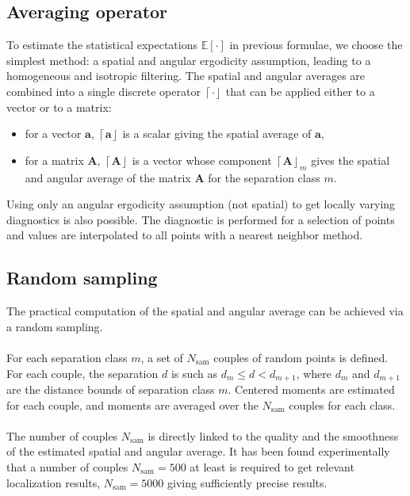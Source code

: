 \documentclass[12pt]{scrartcl}
\begin{document}
\subsection{Averaging operator}
To estimate the statistical expectations $\mathbb{E} [\cdot]$ in previous formulae, we choose the simplest method: a spatial and angular ergodicity assumption, leading to a homogeneous and isotropic filtering. The spatial and angular averages are combined into a single discrete operator $\left\lceil \cdot\right\rfloor$ that can be applied either to a vector or to a matrix:
\begin{itemize}
\item for a vector $\mathbf{a}$,  $\left\lceil \mathbf{a} \right\rfloor$ is a scalar giving the spatial average of $\mathbf{a}$,
\item for a matrix $\mathbf{A}$, $\left\lceil \mathbf{A} \right\rfloor$ is a vector whose component $\left\lceil \mathbf{A} \right\rfloor_m$ gives the spatial and angular average of the matrix $\mathbf{A}$ for the separation class $m$.
\end{itemize}
Using only an angular ergodicity assumption (not spatial) to get locally varying diagnostics is also possible. The diagnostic is performed for a selection of points and values are interpolated to all points with a nearest neighbor method.

\subsection{Random sampling}
The practical computation of the spatial and angular average can be achieved via a random sampling.\\
$  $\\
For each separation class $m$, a set of $N_\mathrm{sam}$ couples of random points is defined. For each couple, the separation $d$ is such as $d_m \le d < d_{m+1}$, where $d_m$ and $d_{m+1}$ are the distance bounds of separation class $m$. Centered moments are estimated for each couple, and moments are averaged over the $N_\mathrm{sam}$ couples for each class.\\
$  $\\
The number of couples $N_\mathrm{sam}$ is directly linked to the quality and the smoothness of the estimated spatial and angular average. It has been found experimentally that a number of couples $N_\mathrm{sam} = 500$ at least is required to get relevant localization results, $N_\mathrm{sam} = 5000$ giving sufficiently precise results.
\end{document}
